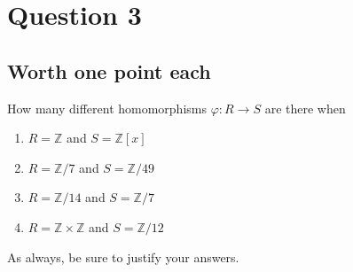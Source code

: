 \documentclass{amsart}[12pt]
\begin{document}
\section*{Question 3}
\subsection*{Worth one point each}
How many different homomorphisms $\varphi:R\to S$ are there when

\begin{enumerate}
\item $R=\mathbb{Z}$ and $S=\mathbb{Z}[x]$
\item $R=\mathbb{Z}/7$ and $S=\mathbb{Z}/49$
\item $R=\mathbb{Z}/14$ and $S=\mathbb{Z}/7$
\item $R=\mathbb{Z}\times\mathbb{Z}$ and $S=\mathbb{Z}/12$
\end{enumerate}

As always, be sure to justify your answers.
\end{document}
